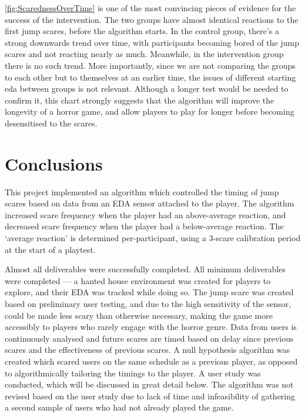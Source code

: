 \documentclass[12pt,a4paper]{article}\usepackage[]{graphicx}\usepackage[]{color}
\begin{document}
\vref{fig:ScarednessOverTime} is one of the most convincing pieces of evidence for the success of the intervention.
The two groups have almost identical reactions to the first jump scares, before the algorithm starts.
In the control group, there's a strong downwards trend over time, with participants becoming bored of the jump scares and not reacting nearly as much.
Meanwhile, in the intervention group there is no such trend.
More importantly, since we are not comparing the groups to each other but to themselves at an earlier time, the issues of different starting eda between groups is not relevant.
Although a longer test would be needed to confirm it, this chart strongly suggests that the algorithm will improve the longevity of a horror game, and allow players to play for longer before becoming desensitised to the scares.

\section{Conclusions}

This project implemented an algorithm which controlled the timing of jump scares based on data from an EDA sensor attached to the player.
The algorithm increased scare frequency when the player had an above-average reaction, and decreased scare frequency when the player had a below-average reaction.
The `average reaction' is determined per-participant, using a 3-scare calibration period at the start of a playtest.

Almost all deliverables were successfully completed.
All minimum deliverables were completed --- a hanted house environment was created for players to explore, and their EDA was tracked while doing so.
The jump scare was created based on preliminary user testing, and due to the high sensitivity of the sensor, could be made less scary than otherwise necessary, making the game more accessibly to players who rarely engage with the horror genre.
Data from users is continuously analysed and future scares are timed based on delay since previous scares and the effectiveness of previous scares.
A null hypothesis algorithm was created which scared users on the same schedule as a previous player, as opposed to algorithmically tailoring the timings to the player.
A user study was conducted, which will be discussed in great detail below.
The algorithm was not revised based on the user study due to lack of time and infeasibility of gathering a second sample of users who had not already played the game.
\end{document}

